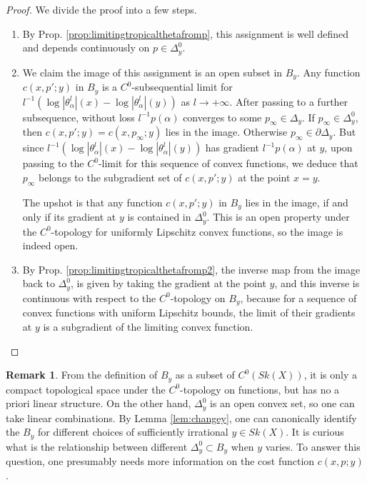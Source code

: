 \documentclass[a4paper]{article}
\theoremstyle{definition}
\newtheorem{rmk}[thm]{Remark}
\begin{document}
\begin{proof}
	We divide the proof into a few steps.
	\begin{enumerate}
		\item By Prop. \ref{prop:limitingtropicalthetafromp}, this assignment is well defined and depends continuously on $p\in \Delta_y^0$. 
		
		\item We claim the image of this assignment is an open subset in $B_y$. Any function $c(x,p';y)$ in $ B_y$ is a $C^0$-subsequential limit for $  l^{-1}(\log |\theta_\alpha^l|(x)- \log |\theta_\alpha^l |(y) )$  as $l\to +\infty$. After passing to a further subsequence, without loss $l^{-1} p(\alpha)$ converges to some $p_\infty\in \Delta_y$. If $p_\infty\in \Delta_y^0$, then $c(x,p';y)= c(x, p_\infty; y)$ lies in the image. Otherwise $p_\infty\in \partial \Delta_y$. But since $  l^{-1}(\log |\theta_\alpha^l|(x)- \log |\theta_\alpha^l |(y) )$ has gradient $l^{-1}p(\alpha)$ at $y$, upon passing to the $C^0$-limit for this sequence of convex functions, we deduce that $p_\infty$ belongs to the subgradient set of $c(x,p';y)$ at the point $x=y$.
		
		
		
		The upshot is that any function $c(x,p';y)$ in $ B_y$ lies in the image, if and only if its gradient at $y$ is contained in $\Delta_y^0$. This is an open property under the $C^0$-topology for uniformly Lipschitz convex functions, so the image is indeed open.
		
		
		
		\item By Prop. \ref{prop:limitingtropicalthetafromp2}, the inverse map from the image back to $\Delta_y^0$, is given by taking the gradient at the point $y$, and this inverse is continuous with respect to the $C^0$-topology on $B_y$, because for a sequence of convex functions with uniform Lipschitz bounds, the limit of their gradients at $y$ is a subgradient of the limiting convex function.
	\end{enumerate}
\end{proof}
	

	
	
	\begin{rmk}
	From the definition of $B_y$ as a subset of $C^0(Sk(X))$, it is only a compact topological space under the $C^0$-topology on functions, but has no a priori linear structure. On the other hand, $\Delta_y^0$ is an open convex set, so one can take linear combinations. By Lemma \ref{lem:changey}, one can canonically identify the $B_y$ for different choices of sufficiently irrational $y\in Sk(X)$.	It is curious what is the relationship between different $\Delta_y^0\subset B_y$ when $y$ varies. To answer this question, one presumably needs more information  on the cost function $c(x,p;y)$.
	\end{rmk}
	
\end{document}
